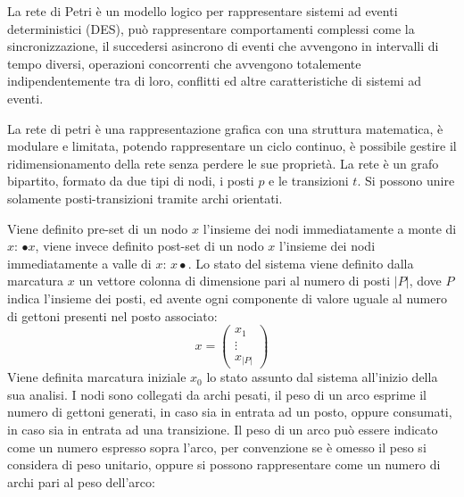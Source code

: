 \documentclass{article}
\numberwithin{equation}{subsection}
\begin{document}
La rete di Petri è un modello logico per rappresentare sistemi ad eventi deterministici (DES), può rappresentare comportamenti complessi come la sincronizzazione, il succedersi 
asincrono di eventi che avvengono in intervalli di tempo diversi, operazioni concorrenti che avvengono totalemente indipendentemente tra di loro, conflitti ed altre 
caratteristiche di sistemi ad eventi. 

La rete di petri è una rappresentazione grafica con una struttura matematica, è modulare e limitata, potendo rappresentare un ciclo continuo, è possibile gestire il ridimensionamento 
della rete senza perdere le sue proprietà. La rete è un grafo bipartito, formato da due tipi di nodi, i posti $p$ e le transizioni $t$. Si possono unire solamente posti-transizioni 
tramite archi orientati. 
\begin{center}
\end{center}
Viene definito pre-set di un nodo $x$ l'insieme dei nodi immediatamente a monte di $x$: $\bullet x$, viene invece definito post-set di un nodo $x$ l'insieme dei nodi 
immediatamente a valle di $x$: $x\bullet$. Lo stato del sistema viene definito dalla marcatura $x$ un vettore colonna di dimensione pari al numero di posti $|P|$, dove $P$ 
indica l'insieme dei posti, ed avente ogni componente di valore uguale al numero di gettoni presenti nel posto associato:
\begin{equation*}
    x=\begin{pmatrix}
        x_1\\
        \vdots\\
        x_{|P|}
    \end{pmatrix}
\end{equation*}
Viene definita marcatura iniziale $x_0$ lo stato assunto dal sistema all'inizio della sua analisi. 
I nodi sono collegati da archi pesati, il peso di un arco esprime il numero di gettoni generati, in caso sia in entrata ad un posto, oppure consumati, in caso sia in entrata 
ad una transizione. Il peso di un arco può essere indicato come un numero espresso sopra l'arco, per convenzione se è omesso il peso si considera di peso unitario, oppure 
si possono rappresentare come un numero di archi pari al peso dell'arco:
\begin{center}
\end{center}
\end{document}
